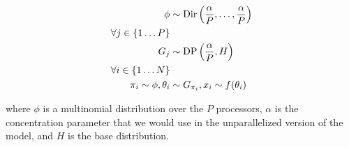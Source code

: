 \begin{align*}
    \phi &\sim \mathrm{Dir}\left(\frac{\alpha}{P}, \ldots, \frac{\alpha}{P}\right) \\
    \forall j \in \{1 \ldots P\} & \\
    G_j &\sim \mathrm{DP}\left(\frac{\alpha}{P}, H\right) \\
    \forall i \in \{1 \ldots N\} & \\
    \pi_i \sim \phi,
    \theta_i &\sim G_{\pi_i},
    x_i \sim f(\theta_i)
\end{align*}

where $\phi$ is a multinomial distribution over the $P$ processors,
$\alpha$ is the concentration parameter that we would use in the
unparallelized version of the model, and $H$ is the base distribution.

